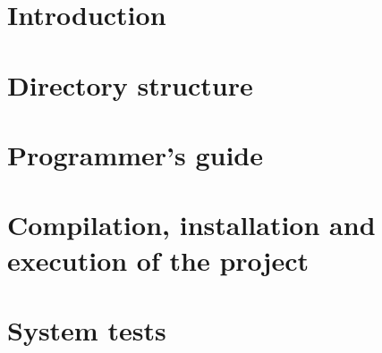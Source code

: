 
\section{Introduction}

\section{Directory structure}

\section{Programmer's guide}

\section{Compilation, installation and execution of the project}

\section{System tests}
